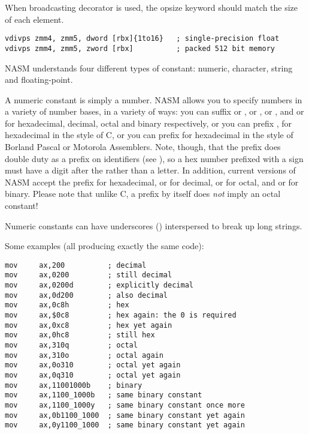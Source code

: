 When broadcasting decorator is used, the opsize keyword should match
the size of each element.

\begin{lstlisting}
vdivps zmm4, zmm5, dword [rbx]{1to16}   ; single-precision float
vdivps zmm4, zmm5, zword [rbx]          ; packed 512 bit memory
\end{lstlisting}


NASM understands four different types of constant: numeric,
character, string and floating-point.


A numeric constant is simply a number. NASM allows you to specify
numbers in a variety of number bases, in a variety of ways: you can
suffix  or ,  or ,  or
, and  or  for hexadecimal, decimal, octal and
binary respectively, or you can prefix , for hexadecimal in
the style of C, or you can prefix \code{\$} for hexadecimal in the style
of Borland Pascal or Motorola Assemblers. Note, though, that the 
\codeindex{\$} prefix does double duty as a prefix on identifiers (see ),
so a hex number prefixed with a \code{\$} sign must have a digit after the
\code{\$} rather than a letter. In addition, current versions of NASM accept
the prefix  for hexadecimal,  or  for decimal,
 or  for octal, and  or  for binary.
Please note that unlike C, a  prefix by itself does \emph{not} imply
an octal constant!

Numeric constants can have underscores (\code{\_}) interspersed to break
up long strings.

Some examples (all producing exactly the same code):

\begin{lstlisting}
mov     ax,200          ; decimal
mov     ax,0200         ; still decimal
mov     ax,0200d        ; explicitly decimal
mov     ax,0d200        ; also decimal
mov     ax,0c8h         ; hex
mov     ax,$0c8         ; hex again: the 0 is required
mov     ax,0xc8         ; hex yet again
mov     ax,0hc8         ; still hex
mov     ax,310q         ; octal
mov     ax,310o         ; octal again
mov     ax,0o310        ; octal yet again
mov     ax,0q310        ; octal yet again
mov     ax,11001000b    ; binary
mov     ax,1100_1000b   ; same binary constant
mov     ax,1100_1000y   ; same binary constant once more
mov     ax,0b1100_1000  ; same binary constant yet again
mov     ax,0y1100_1000  ; same binary constant yet again
\end{lstlisting}

